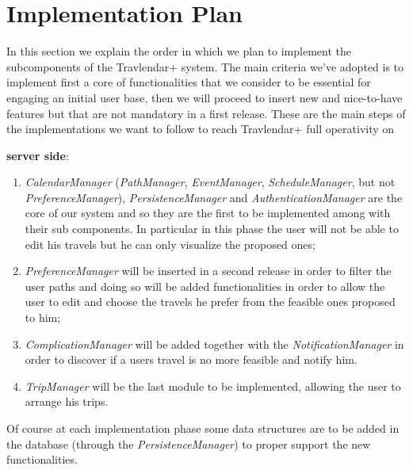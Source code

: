 \section{Implementation Plan}
In this section we explain the order in which we plan to implement the subcomponents of the Travlendar+ system.
The main criteria we've adopted is to implement first a core of functionalities that we consider to be essential for engaging an initial user base, then we will proceed to insert new and nice-to-have features but that are not mandatory in a first release.
These are the main steps of the implementations we want to follow to reach Travlendar+ full operativity on\begin{large}
\textbf{server side}:
\end{large}
\begin{enumerate}
\item \textit{CalendarManager} (\textit{PathManager}, \textit{EventManager}, \textit{ScheduleManager}, but not \textit{PreferenceManager}), \textit{PersistenceManager} and \textit{AuthenticationManager} are the core of our system and so they are the first to be implemented among with their sub components. In particular in this phase the user will not be able to edit his travels but he can only visualize the proposed ones;
\item \textit{PreferenceManager} will be inserted in a second release in order to filter the user paths and doing so will be added functionalities in order to allow the user to edit and choose the travels he prefer from the feasible ones proposed to him;
\item \textit{ComplicationManager} will be added together with the \textit{NotificationManager} in order to discover if a users travel is no more feasible and notify him.
\item \textit{TripManager} will be the last module to be implemented, allowing the user to arrange his trips.
\end{enumerate}
Of course at each implementation phase some data structures are to be added in the database (through the \textit{PersistenceManager}) to proper support the new functionalities.

